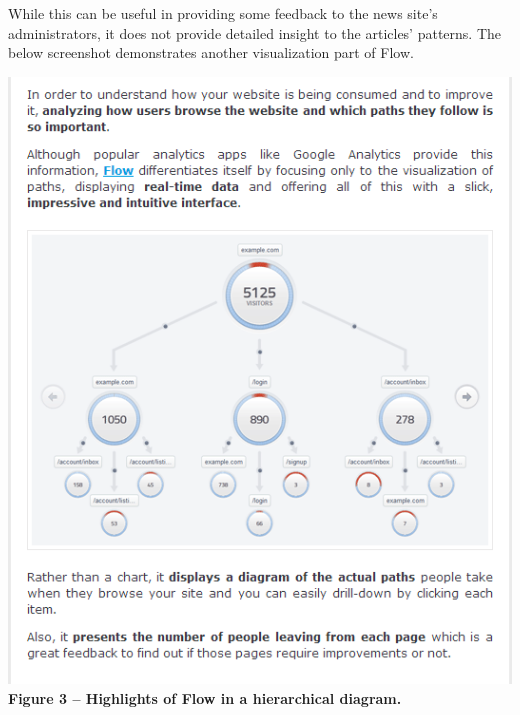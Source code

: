 \documentclass[12pt]{article}
\begin{document}
While this can be useful in providing some feedback to the news site's administrators, it does not provide detailed insight to the articles' patterns. The below screenshot demonstrates another visualization part of Flow.

\vspace{0.3in}


\noindent\includegraphics[scale=0.7]{img/flow1} \\
\noindent\textbf{Figure 3 -- Highlights of Flow in a hierarchical diagram.} \\

\newpage
\end{document}
